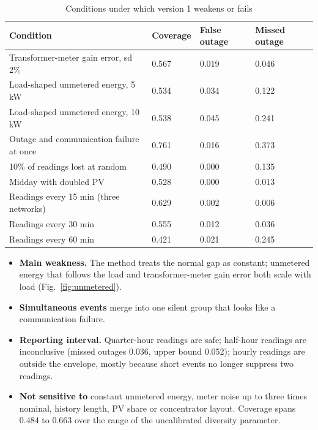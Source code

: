 \begin{table}[!t]
\caption{Conditions under which version 1 weakens or fails}\label{tab:weakens}
\centering\scriptsize\setlength{\tabcolsep}{2.5pt}
\begin{tabularx}{\columnwidth}{@{}Y C{0.14\columnwidth} C{0.14\columnwidth} C{0.14\columnwidth}@{}}
\toprule
\textbf{Condition} & \textbf{Coverage} & \textbf{False outage} & \textbf{Missed outage} \\
\midrule
Transformer-meter gain error, sd 2\% & 0.567 & 0.019 & 0.046 \\
Load-shaped unmetered energy, 5 kW & 0.534 & 0.034 & 0.122 \\
Load-shaped unmetered energy, 10 kW & 0.538 & 0.045 & 0.241 \\
Outage and communication failure at once & 0.761 & 0.016 & 0.373 \\
10\% of readings lost at random & 0.490 & 0.000 & 0.135 \\
Midday with doubled PV & 0.528 & 0.000 & 0.013 \\
\midrule
Readings every 15 min (three networks) & 0.629 & 0.002 & 0.006 \\
Readings every 30 min & 0.555 & 0.012 & 0.036 \\
Readings every 60 min & 0.421 & 0.021 & 0.245 \\
\bottomrule
\end{tabularx}
\end{table}

\begin{itemize}
\item \textbf{Main weakness.} The method treats the normal gap as constant; unmetered energy that
follows the load and transformer-meter gain error both scale with load (Fig.~\ref{fig:unmetered}).
\item \textbf{Simultaneous events} merge into one silent group that looks like a communication failure.
\item \textbf{Reporting interval.} Quarter-hour readings are safe; half-hour readings are
inconclusive (missed outages 0.036, upper bound 0.052); hourly readings are outside the envelope,
mostly because short events no longer suppress two readings.
\item \textbf{Not sensitive to} constant unmetered energy, meter noise up to three times nominal,
history length, PV share or concentrator layout. Coverage spans 0.484 to 0.663 over the range of the
uncalibrated diversity parameter.
\end{itemize}

